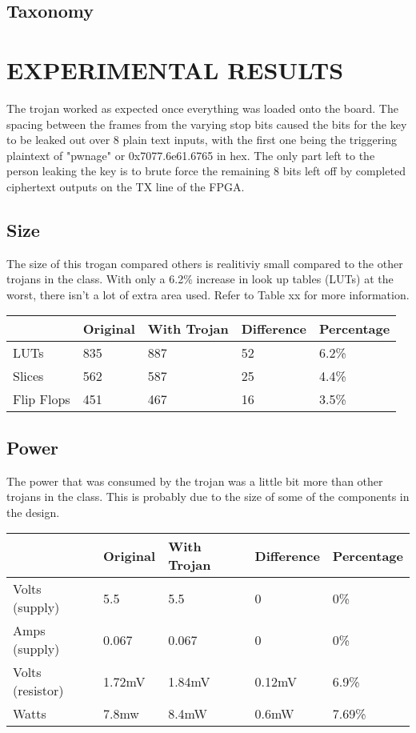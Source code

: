 \documentclass[letterpaper, 10 pt, conference]{ieeeconf}  %
\begin{document}
\subsection{Taxonomy}
  
\section{EXPERIMENTAL RESULTS}

The trojan worked as expected once everything was loaded onto the board. The spacing between the frames from the varying stop bits caused the bits for the key to be leaked out over 8 plain text inputs, with the first one being the triggering plaintext of "pwnage" or 0x7077.6e61.6765 in hex. The only part left to the person leaking the key is to brute force the remaining 8 bits left off by completed ciphertext outputs on the TX line of the FPGA. 

\subsection{Size}
 
The size of this trogan compared others is realitiviy small compared to the other trojans in the class. With only a 6.2\% increase in look up tables (LUTs) at the worst, there isn't a lot of extra area used. Refer to Table xx for more information.

 \begin{center}
    \begin{tabular}{| l | l | l | l | l |}
        \hline
        & Original & With Trojan & Difference & Percentage \\ \hline
        LUTs & 835 & 887 & 52 & 6.2\% \\ \hline
        Slices & 562 & 587 & 25 & 4.4\% \\ \hline
        Flip Flops & 451 & 467 & 16 & 3.5\% \\
        \hline
    \end{tabular}
\end{center}

\subsection{Power}

The power that was consumed by the trojan was a little bit more than other trojans in the class. This is probably due to the size of some of the components in the design.

 \begin{center}
    \begin{tabular}{| l | l | l | l | l |}
        \hline
        & Original & With Trojan & Difference & Percentage \\ \hline
        Volts (supply) & 5.5 & 5.5 & 0 & 0\% \\ \hline
        Amps (supply) & 0.067 & 0.067 & 0 & 0\% \\ \hline
        Volts (resistor) & 1.72mV & 1.84mV & 0.12mV & 6.9\% \\
        Watts & 7.8mw & 8.4mW & 0.6mW & 7.69\% \\
        \hline
    \end{tabular}
\end{center}
\end{document}

